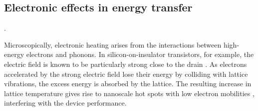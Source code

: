 

\subsection{Electronic effects in energy transfer}
\label{sec:intro_electrons}

 \cite{pop06_ieee,moore14}.

Microscopically, electronic heating arises from the interactions between high-energy electrons and phonons. In silicon-on-insulator transistors, for example, the electric field is known to be particularly strong close to the drain \cite{pop06_ieee}. As electrons accelerated by the strong electric field lose their energy by colliding with lattice vibrations, the excess energy is absorbed by the lattice. The resulting increase in lattice temperature gives rise to nanoscale hot spots with low electron mobilities \cite{pop06_ieee}, interfering with the device performance. %

